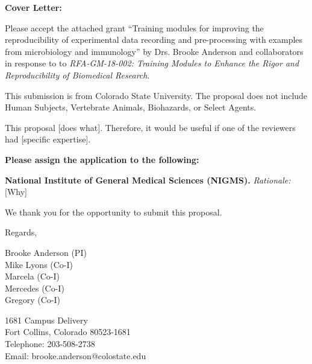 \documentclass[pdftex,english,11pt,parskip=half]{scrartcl}
\begin{document}
\def\bf{\normalfont\bfseries}
\pagestyle{empty}

{\large \textbf{Cover Letter:}}

Please accept the attached grant ``Training modules for improving the reproducibility of experimental data recording and pre-processing with examples from microbiology and immunology'' by Drs. Brooke Anderson and collaborators in response to to \textit{RFA-GM-18-002: Training Modules to Enhance the Rigor and Reproducibility of Biomedical Research}.

\vspace{0.1in}

This submission is from Colorado State University. The proposal does not include Human Subjects, Vertebrate Animals, Biohazards, or Select Agents.

\vspace{0.1in}

This proposal [does what]. Therefore, it would be useful if one of the reviewers had [specific expertise]. 

\vspace{0.1in}

\noindent \textbf{Please assign the application to the following:}
\begin{description}
 \item \textbf{National Institute of General Medical Sciences (NIGMS).} 
   \textit{Rationale:} [Why]  
 \end{description}

\vspace{0.1in}

We thank you for the opportunity to submit this proposal. 

\vspace{0.2in}

Regards, 

\vspace{0.8in}

Brooke Anderson (PI) \\
Mike Lyons (Co-I) \\
Marcela (Co-I) \\
Mercedes (Co-I) \\
Gregory (Co-I)

1681 Campus Delivery \\
Fort Collins, Colorado 80523-1681 \\
Telephone: 203-508-2738 \\
Email: brooke.anderson@colostate.edu \\
\end{document}
